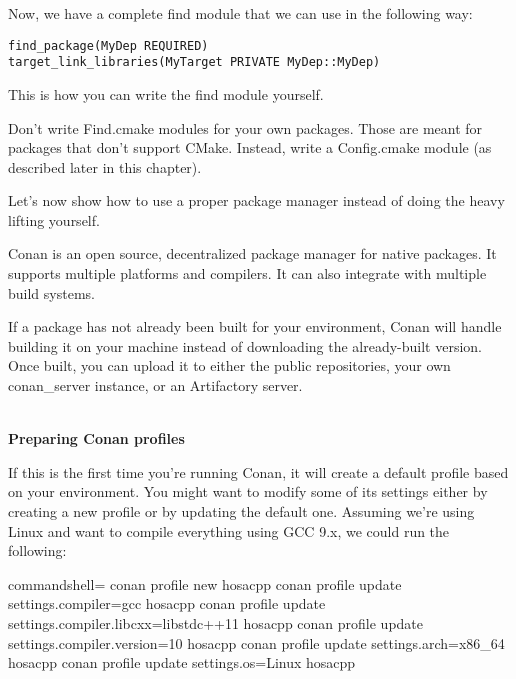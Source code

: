Now, we have a complete find module that we can use in the following way:

\begin{lstlisting}[style=styleCMake]
find_package(MyDep REQUIRED)
target_link_libraries(MyTarget PRIVATE MyDep::MyDep)
\end{lstlisting}

This is how you can write the find module yourself.

\begin{tcolorbox}[colback=blue!5!white,colframe=blue!75!black, title=Note]
\hspace*{0.7cm}Don't write Find\*.cmake modules for your own packages. Those are meant for packages that don't support CMake. Instead, write a Config\*.cmake module (as described later in this chapter).
\end{tcolorbox}

Let's now show how to use a proper package manager instead of doing the heavy lifting yourself.


Conan is an open source, decentralized package manager for native packages. It supports multiple platforms and compilers. It can also integrate with multiple build systems.

If a package has not already been built for your environment, Conan will handle building it on your machine instead of downloading the already-built version. Once built, you can upload it to either the public repositories, your own conan\_server instance, or an Artifactory server.

\hspace*{\fill} \\ %
\noindent
\textbf{Preparing Conan profiles}

If this is the first time you're running Conan, it will create a default profile based on your environment. You might want to modify some of its settings either by creating a new profile or by updating the default one. Assuming we're using Linux and want to compile everything using GCC 9.x, we could run the following:

\begin{tcblisting}{commandshell={}}
conan profile new hosacpp
conan profile update settings.compiler=gcc hosacpp
conan profile update settings.compiler.libcxx=libstdc++11 hosacpp
conan profile update settings.compiler.version=10 hosacpp
conan profile update settings.arch=x86_64 hosacpp
conan profile update settings.os=Linux hosacpp
\end{tcblisting}

